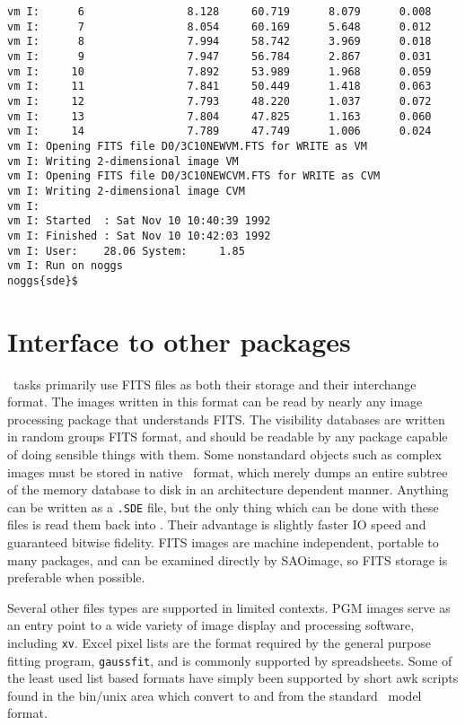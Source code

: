 \begin{verbatim}
vm I:      6                8.128     60.719      8.079      0.008
vm I:      7                8.054     60.169      5.648      0.012
vm I:      8                7.994     58.742      3.969      0.018
vm I:      9                7.947     56.784      2.867      0.031
vm I:     10                7.892     53.989      1.968      0.059
vm I:     11                7.841     50.449      1.418      0.063
vm I:     12                7.793     48.220      1.037      0.072
vm I:     13                7.804     47.825      1.163      0.060
vm I:     14                7.789     47.749      1.006      0.024
vm I: Opening FITS file D0/3C10NEWVM.FTS for WRITE as VM
vm I: Writing 2-dimensional image VM
vm I: Opening FITS file D0/3C10NEWCVM.FTS for WRITE as CVM
vm I: Writing 2-dimensional image CVM
vm I:
vm I: Started  : Sat Nov 10 10:40:39 1992
vm I: Finished : Sat Nov 10 10:42:03 1992
vm I: User:    28.06 System:     1.85
vm I: Run on noggs
noggs{sde}$ 
\end{verbatim}

\newpage
\section{Interface to other packages}

\sde\ tasks primarily use FITS files as both their storage and their
interchange format.  The images written in this format can be read by
nearly any image processing package that understands FITS.  The
visibility databases are written in random groups FITS format, and
should be readable by any package capable of doing sensible things
with them.  Some nonstandard objects such as complex images must be
stored in native \sde\ format, which merely dumps an entire subtree of
the memory database to disk in an architecture dependent manner.
Anything can be written as a {\tt .SDE} file, but the only thing which
can be done with these files is read them back into \sde.  Their
advantage is slightly faster IO speed and guaranteed bitwise fidelity.
FITS images are machine independent, portable to many packages, and
can be examined directly by SAOimage, so FITS storage is preferable
when possible.

Several other files types are supported in limited contexts.  PGM images
serve as an entry point to a wide variety of image display and processing
software, including {\tt xv}.  Excel pixel lists are the format required
by the general purpose fitting program, {\tt gaussfit}, and is commonly
supported by spreadsheets.  Some of the least used list based formats have
simply been supported by short awk scripts found in the bin/unix area
which convert to and from the standard \sde\ model format.

